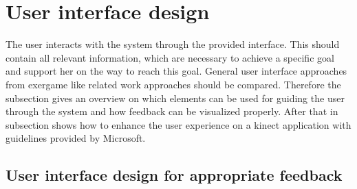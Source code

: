 \section{User interface design}
The user interacts with the system through the provided interface. This should contain all relevant information, which are necessary to achieve a specific goal and support her on the way to reach this goal. General user interface approaches from exergame like related work approaches should be compared. Therefore the subsection \textit{} gives an overview on which elements can be used for guiding the user through the system and how feedback can be visualized properly. After that in subsection \textit{} shows how to enhance the user experience on a kinect application with guidelines provided by Microsoft.

\subsection{User interface design for appropriate feedback}\label{2_5_1_userInterfacefeedback}

